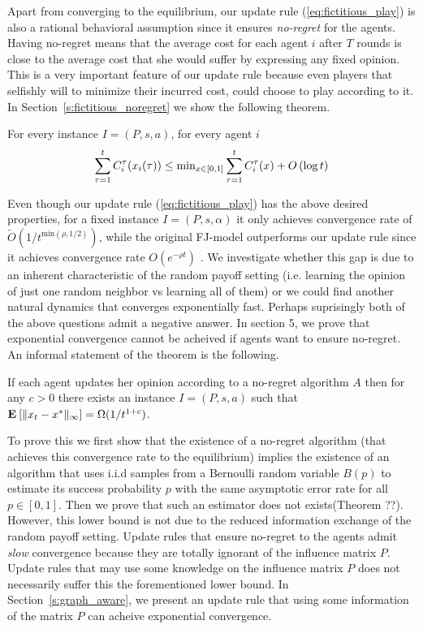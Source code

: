 Apart from converging to the equilibrium, our update rule
(\ref{eq:fictitious_play}) is also a rational behavioral
assumption since it ensures \emph{no-regret} for the agents.
Having no-regret means that the average cost for each agent $i$
after $T$ rounds is close to the average cost that she would
suffer by expressing any fixed opinion. This is a very important
feature of our update rule because even players that selfishly
will to minimize their incurred cost, could choose to play according
to it. In Section~\ref{s:fictitious_noregret} we show the following
theorem.

\begin{theorem}\label{t:fictitious_noregret}
For every instance $I=(P,s,a)$, for every agent $i$
\[\sum_{\tau=1}^tC_i^\tau(x_i(\tau)) \leq \text{min}_{x \in [0,1]}\sum_{\tau=1}^tC_i^\tau(x) + O\left(\log t\right)\]
\end{theorem}

Even though our update rule (\ref{eq:fictitious_play}) has the above
desired properties, for a fixed instance $I=(P,s,\alpha)$ it only achieves convergence rate of
$\widetilde{O}(1/t^{\text{min}(\rho,1/2)})$, while the original FJ-model outperforms
our update rule since it achieves convergence rate $O(e^{-\rho t})$ \cite{GS14}.
We investigate whether this gap is due to an inherent characteristic
of the random payoff setting (i.e. learning the opinion of just one random
neighbor vs learning all of them) or we could find another natural dynamics
that converges exponentially fast. Perhaps suprisingly both of the above questions admit
a negative answer. In section 5, we prove that exponential convergence
cannot be acheived if agents want to ensure no-regret. An informal statement of the 
theorem is the following.

\begin{theorem}\label{thm:lower_bound}
If each agent updates her opinion according to a no-regret algorithm $A$ then for any $c>0$ there
exists an instance $I=(P,s,a)$ such that $\Exp{\norm{\infty}{x_t - x^*}} = \Omega(1/t^{1+c})$.
\end{theorem}

To prove this we first show that the existence of a no-regret
algorithm (that achieves this convergence rate to the equilibrium) implies
the existence of an algorithm that uses i.i.d samples from a Bernoulli random
variable $B(p)$ to estimate its success probability $p$ with the same asymptotic
error rate for all $p \in [0,1]$. Then we prove that such an estimator does not exists(Theorem ??).
However, this lower bound is not due to the reduced information exchange of
the random payoff setting. Update rules that ensure no-regret to the agents admit 
\emph{slow} convergence because they are totally ignorant of the influence matrix $P$.
Update rules that may use some knowledge on the influence matrix $P$ does not necessarily suffer
this the forementioned lower bound. In Section~\ref{s:graph_aware}, we present an update rule 
that using some information of the matrix $P$ can acheive exponential convergence. 

